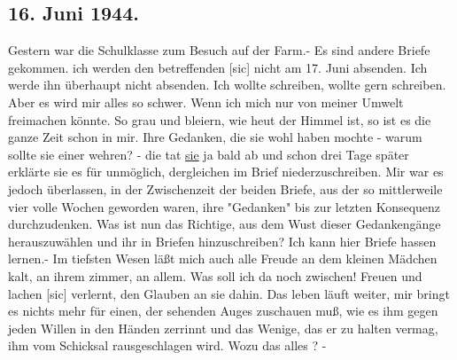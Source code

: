 \subsection{16. Juni 1944.}
Gestern war die Schulklasse zum Besuch auf der Farm.-
Es sind andere Briefe gekommen.
ich werden den betreffenden{\color{red} [sic] } nicht am 17. Juni absenden.
Ich werde ihn \"{u}berhaupt nicht absenden.
Ich wollte schreiben, wollte gern schreiben.
Aber es wird mir alles so schwer.
Wenn ich mich nur von meiner Umwelt freimachen k\"{o}nnte.
So grau und bleiern, wie heut der Himmel ist, so ist es die ganze Zeit schon in mir.
Ihre Gedanken, die sie wohl haben mochte - warum sollte sie einer wehren? - die tat \ul{sie} ja bald ab und schon drei Tage sp\"{a}ter erkl\"{a}rte sie es f\"{u}r unm\"{o}glich, dergleichen im Brief niederzuschreiben.
Mir war es jedoch \"{u}berlassen, in der Zwischenzeit der beiden Briefe, aus der so mittlerweile vier volle Wochen geworden waren, ihre "Gedanken" bis zur letzten Konsequenz durchzudenken.
Was ist nun das Richtige, aus dem Wust dieser Gedankeng\"{a}nge herauszuw\"{a}hlen und ihr in Briefen hinzuschreiben?
Ich kann hier Briefe hassen lernen.-
Im tiefsten Wesen l\"{a}{\ss}t mich auch alle Freude an dem kleinen M\"{a}dchen kalt, an ihrem zimmer, an allem.
Was soll ich da noch zwischen!
Freuen und lachen{\color{red} [sic] } verlernt, den Glauben an sie dahin.
Das leben l\"{a}uft weiter, mir bringt es nichts mehr f\"{u}r einen, der sehenden Auges zuschauen mu{\ss}, wie es ihm gegen jeden Willen in den H\"{a}nden zerrinnt und das Wenige, das er zu halten vermag, ihm vom Schicksal rausgeschlagen wird.
Wozu das alles ? -

\clearpage
